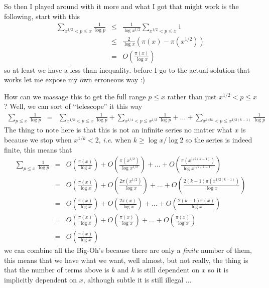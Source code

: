 \documentclass[aps,preprint,preprintnumbers,nofootinbib,showpacs,prd]{revtex4-1}
\newcommand{\ie}{{\it i.e.} }
\newcommand{\nbea}{\begin{eqnarray*}}
\newcommand{\neea}{\end{eqnarray*}}
\begin{document}
So then I played around with it more and what I got that might work is the following, start with this
%
\nbea
\sum_{x^{1/2} < p \le x} \frac{1} {\log p} & \le & \frac{1} {\log x^{1/2}} \sum_{x^{1/2} < p \le x}1  \\
& \le & \frac{2} {\log x} (\pi(x) - \pi(x^{1/2}))  \\
& = & O\left(\frac{\pi(x)}{\log x}\right)
\neea
%
so at least we have a less than inequality. before I go to the actual solution that works let me expose my own erroneous way :)

How can we massage this to get the full range $p \le x$ rather than just $x^{1/2} < p \le x$? Well, we can sort of ``telescope'' it this way
%
\nbea
\sum_{p \le x} \frac{1} {\log p} & = & \sum_{x^{1/2} < p \le x} \frac{1} {\log p} + \sum_{x^{1/4} < p \le x^{1/2}} \frac{1} {\log p} + \dots + \sum_{x^{1/2k} < p \le x^{1/2(k-1)}} \frac{1} {\log p}
\neea
%
The thing to note here is that this is not an infinite series no matter what $x$ is because we stop when $x^{1/k} < 2$, \ie when $k \ge \log x/\log 2$ so the series is indeed finite, this means that
%
\nbea
\sum_{p \le x} \frac{1} {\log p} & = & O\left(\frac{\pi(x)}{\log x}\right) + O\left(\frac{\pi(x^{1/2})}{\log x^{1/2}}\right) + \dots + O\left(\frac{\pi(x^{1/2(k-1)})}{\log x^{1/2(k-1)}}\right) \\
& = & O\left(\frac{\pi(x)}{\log x}\right) + O\left(\frac{2 \pi(x^{1/2})}{\log x}\right) + \dots + O\left(\frac{2(k-1)\pi(x^{1/2(k-1)})}{\log x}\right) \\
& = & O\left(\frac{\pi(x)}{\log x}\right) + O\left(\frac{2 \pi(x)}{\log x}\right) + \dots + O\left(\frac{2(k-1)\pi(x)}{\log x}\right) \\
& = & O\left(\frac{\pi(x)}{\log x}\right) + O\left(\frac{\pi(x)}{\log x}\right) + \dots + O\left(\frac{\pi(x)}{\log x}\right) \\
& = & O\left(\frac{\pi(x)}{\log x}\right)
\neea
%
we can combine all the Big-Oh's because there are only a {\it finite} number of them, this means that we have what we want, well almost, but not really, the thing is that the number of terms above is $k$ and $k$ is still dependent on $x$ so it is implicitly dependent on $x$, although subtle it is still illegal ...
\end{document}
